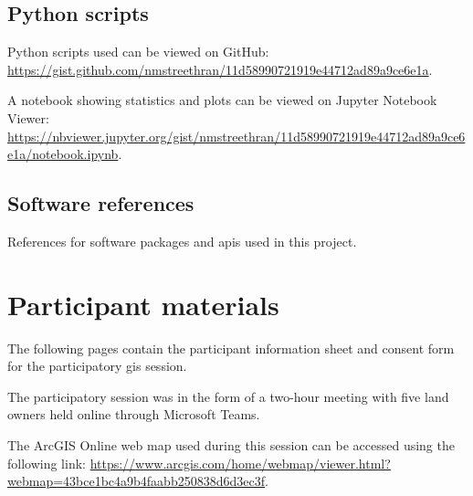 \section*{Python scripts}

Python scripts used can be viewed on GitHub:
\url{https://gist.github.com/nmstreethran/11d58990721919e44712ad89a9ce6e1a}.

A notebook showing statistics and plots can be viewed on Jupyter Notebook
Viewer:
\url{https://nbviewer.jupyter.org/gist/nmstreethran/11d58990721919e44712ad89a9ce6e1a/notebook.ipynb}.

\section*{Software references}

References for software packages and \glspl{api} used in this project.

\printbibliography[notcategory=cited,heading=none,keyword=software]

\chapter{Participant materials \label{app:pgis}}

The following pages contain the participant information sheet and consent form for the participatory \gls{gis} session.

The participatory session was in the form of a two-hour meeting with five land owners held online through Microsoft Teams.

The ArcGIS Online web map used during this session can be accessed using the following link:
\url{https://www.arcgis.com/home/webmap/viewer.html?webmap=43bce1bc4a9b4faabb250838d6d3ec3f}.
